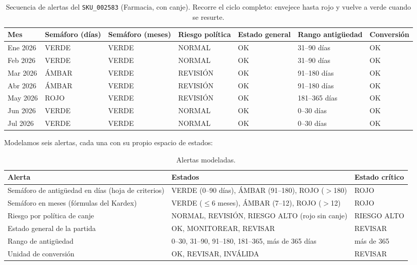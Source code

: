 \documentclass[11pt,letterpaper]{article}
\begin{document}
\begin{table}[H]
\centering\footnotesize\setlength{\tabcolsep}{3.5pt}
\begin{tabular}{@{}lllllll@{}}
\toprule
Mes & Semáforo (días) & Semáforo (meses) & Riesgo política & Estado general & Rango antigüedad & Conversión \\
\midrule
Ene 2026 & VERDE & VERDE & NORMAL & OK & 31--90 días & OK \\
Feb 2026 & VERDE & VERDE & NORMAL & OK & 31--90 días & OK \\
Mar 2026 & ÁMBAR & VERDE & REVISIÓN & OK & 91--180 días & OK \\
Abr 2026 & ÁMBAR & VERDE & REVISIÓN & OK & 91--180 días & OK \\
May 2026 & ROJO & VERDE & REVISIÓN & OK & 181--365 días & OK \\
Jun 2026 & VERDE & VERDE & NORMAL & OK & 0--30 días & OK \\
Jul 2026 & VERDE & VERDE & NORMAL & OK & 0--30 días & OK \\
\bottomrule
\end{tabular}
\caption{Secuencia de alertas del \texttt{SKU\_002583} (Farmacia, con canje). Recorre el ciclo completo: envejece hasta rojo y vuelve a verde cuando se resurte.}
\label{tab:secuencia}
\end{table}

Modelamos seis alertas, cada una con su propio espacio de estados:

\begin{table}[H]
\centering\small
\begin{tabularx}{\textwidth}{@{}l L l@{}}
\toprule
Alerta & Estados & Estado crítico \\
\midrule
Semáforo de antigüedad en días (hoja de criterios) & VERDE (0--90 días), ÁMBAR (91--180), ROJO ($>$180) & ROJO \\
Semáforo en meses (fórmulas del Kardex) & VERDE ($\le$6 meses), ÁMBAR (7--12), ROJO ($>$12) & ROJO \\
Riesgo por política de canje & NORMAL, REVISIÓN, RIESGO ALTO (rojo sin canje) & RIESGO ALTO \\
Estado general de la partida & OK, MONITOREAR, REVISAR & REVISAR \\
Rango de antigüedad & 0--30, 31--90, 91--180, 181--365, más de 365 días & más de 365 \\
Unidad de conversión & OK, REVISAR, INVÁLIDA & REVISAR \\
\bottomrule
\end{tabularx}
\caption{Alertas modeladas.}
\end{table}
\end{document}
